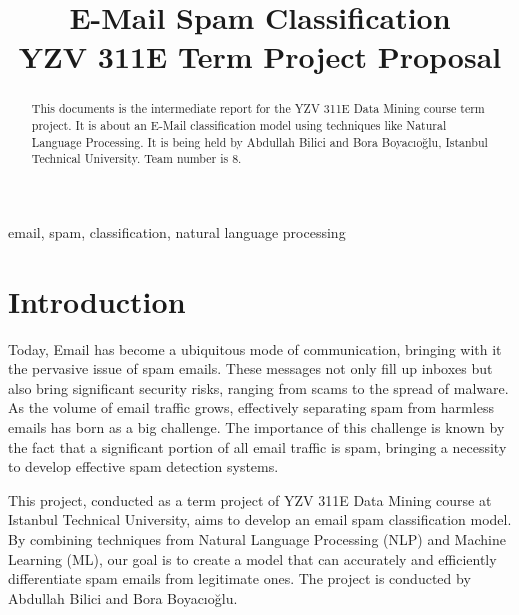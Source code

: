 \documentclass[conference]{IEEEtran}
\begin{document}
\title{E-Mail Spam Classification\\
{\Large YZV 311E Term Project Proposal}
}

\author{
\and
{}
}

\maketitle

\begin{abstract}
This documents is the intermediate report for the YZV 311E Data Mining course term project. It is about an E-Mail classification model using techniques like Natural Language Processing. It is being held by Abdullah Bilici and Bora Boyacıoğlu, Istanbul Technical University. Team number is 8.
\end{abstract}

\begin{IEEEkeywords}
email, spam, classification, natural language processing
\end{IEEEkeywords}

\section{Introduction}

Today, Email has become a ubiquitous mode of communication, bringing with it the pervasive issue of spam emails. These messages not only fill up inboxes but also bring significant security risks, ranging from scams to the spread of malware. As the volume of email traffic grows, effectively separating spam from harmless emails has born as a big challenge. The importance of this challenge is known by the fact that a significant portion of all email traffic is spam, bringing a necessity to develop effective spam detection systems.

This project, conducted as a term project of YZV 311E Data Mining course at Istanbul Technical University, aims to develop an email spam classification model. By combining techniques from Natural Language Processing (NLP) and Machine Learning (ML), our goal is to create a model that can accurately and efficiently differentiate spam emails from legitimate ones. The project is conducted by Abdullah Bilici and Bora Boyacıoğlu.
\end{document}
